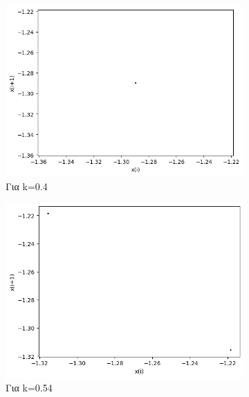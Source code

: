 \begin{figure}[h!]
	\centering
	
	\begin{subfigure}[b]{0.4\textwidth}
		\centering
		\includegraphics[width=\textwidth]{LateX images/graphs q14/g11}
		\caption{Για k=0.4}
		\label{f:k}
	\end{subfigure}
	\hfill
	\begin{subfigure}[b]{0.4\textwidth}
		\centering
		\includegraphics[width=\textwidth]{LateX images/graphs q14/g12}
		\caption{Για k=0.54}
		\label{f:k69}
	\end{subfigure}
	\hfill
	\begin{subfigure}[b]{0.4\textwidth}
		\centering

\end{subfigure}
\end{figure}
